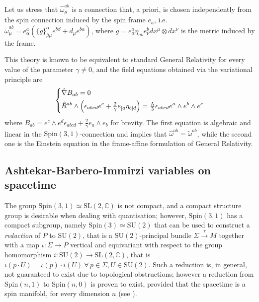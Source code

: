 \documentclass[a4paper, 11pt]{article}
\def\C{\mathbb{C}}
\def\al{\alpha}
\def\be{\beta}
\def\ga{\gamma}
\def\ep{\epsilon}
\def\io{\iota}
\def\om{\omega}
\def\La{\Lambda}
\def\Si{\Sigma}
\def\na{\nabla}
\def\we{\wedge}
\def\SU(#1){\mathrm{SU}(#1)}
\def\SL(#1){\mathrm{SL}(#1)}
\def\Spin(#1){\mathrm{Spin}(#1)}
\def\chr#1#2#3#4{\{#1\}^#2_{#3 #4}}
\numberwithin{equation}{section}
\begin{document}
Let us stress that $\hat \om^{ab}_\mu$ is a connection that, a priori, is chosen independently from the spin connection induced by the spin frame $e_a$, i.e. $\tilde \om^{ab}_\mu = e^a_\al(\chr g\al\be\mu e^{b\be} + d_\mu e^{b\al})$, where $g = e^a_\al\eta_{ab}e^b_\nu dx^\mu \otimes dx^\nu$ is the metric induced by the frame. 

This theory is known to be equivalent to standard General Relativity for every value of the parameter $\gamma \neq 0$, and the field equations obtained via the variational principle are
\begin{equation}
    \begin{dcases}
    \hat\na  B_{ab} = 0\\
    \hat R^{ab} \we \left(\ep_{abcd} e^c  + \tfrac 2 \ga e_{[a} \eta_{b]d}\right) = \tfrac \La 3 \ep_{abcd} e^a \we e^b \we e^c 
\end{dcases}
\label{eq:holst_equations}
\end{equation}
where $B_{ab} = e^c \we e^d \ep_{abcd} + \tfrac 2 \ga e_a \we e_b$ for brevity. The first equation is algebraic and linear in the $\Spin(3,1)$-connection and implies that $\hat \om^{ab} = \tilde \om^{ab}$, while the second one is the Einstein equation in the frame-affine formulation of General Relativity.


\subsection{Ashtekar-Barbero-Immirzi variables on spacetime}
The group $\Spin(3,1)\simeq\SL(2,\C)$ is not compact, and a compact structure group is desirable when dealing with quantisation; however, $\Spin(3,1)$ has a compact subgroup, namely $\Spin(3) \simeq \SU(2)$ that can be used to construct a \textit{reduction} of $P$ to $\SU(2)$, that is a $\SU(2)$-principal bundle $\Si \xrightarrow{\ \tau \ } M$ together with a map $\io: \Si \to P$  vertical and equivariant with respect to the group homomorphism $i : \SU(2) \to \SL(2,\C)$, that is $\io(p\cdot U) = \io(p) \cdot i(U)\ \forall \, p \in \Si, U \in \SU(2) $. Such a reduction is, in general, not guaranteed to exist due to topological obstructions; however a reduction from $\Spin(n,1)$ to $\Spin(n, 0)$ is proven to exist, provided that the spacetime is a spin manifold,  for every dimension $n$ (see \cite{orizzonteBarberoImmirziConnectionsHow2021}).
\end{document}
